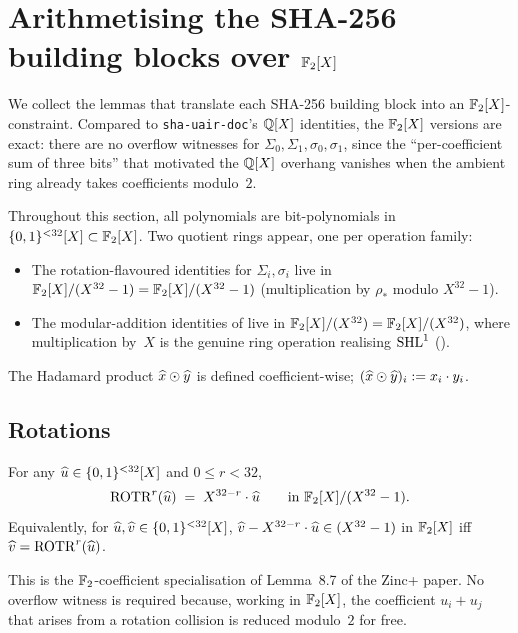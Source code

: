 \section{Arithmetising the SHA-256 building blocks over $\mathbb{F}_2[X]$}\label{sec:arith}

We collect the lemmas that translate each SHA-256 building block into
an $\mathbb{F}_2[X]$-constraint. Compared to \texttt{sha-uair-doc}'s $\mathbb{Q}[X]$
identities, the $\mathbb{F}_2[X]$ versions are exact: there are no overflow
witnesses for $\Sigma_0, \Sigma_1, \sigma_0, \sigma_1$, since the
``per-coefficient sum of three bits'' that motivated the $\mathbb{Q}[X]$
overhang vanishes when the ambient ring already takes coefficients
modulo~$2$.

Throughout this section, all polynomials are bit-polynomials in
$\{0,1\}^{<32}[X] \subset \mathbb{F}_2[X]$. Two quotient rings appear, one per
operation family:
\begin{itemize}[leftmargin=2em,topsep=2pt]
  \item The rotation-flavoured identities for $\Sigma_i, \sigma_i$
        live in $\mathbb{F}_2[X]/(X^{32}-1) = \mathbb{F}_2[X]/(X^{32}-1)$ (multiplication by
        $\rho_*$ modulo $X^{32}-1$).
  \item The modular-addition identities of  live in
        $\mathbb{F}_2[X]/(X^{32}) = \mathbb{F}_2[X]/(X^{32})$, where multiplication by~$X$ is
        the genuine ring operation realising $\operatorname{SHL}^{1}$
        ().
\end{itemize}
The Hadamard product $\widehat{x} \odot \widehat{y}$ is defined coefficient-wise;
$(\widehat{x} \odot \widehat{y})_i := x_i \cdot y_i$.

\subsection{Rotations}\label{sec:rot}

\begin{lemma}\label{lem:rot}
For any $\widehat{u} \in \{0,1\}^{<32}[X]$ and $0 \le r < 32$,
$$
\operatorname{ROTR}^{r}(\widehat{u}) \;=\; X^{32-r}\cdot \widehat{u} \qquad \text{in } \mathbb{F}_2[X]/(X^{32}-1).
$$
Equivalently, for $\widehat{u}, \widehat{v} \in \{0,1\}^{<32}[X]$,
$\widehat{v} - X^{32-r}\cdot \widehat{u} \in (X^{32}-1)$ in $\mathbb{F}_2[X]$ iff
$\widehat{v} = \operatorname{ROTR}^{r}(\widehat{u})$.
\end{lemma}

This is the $\mathbb{F}_2$-coefficient specialisation of Lemma~8.7 of the
Zinc+ paper. No overflow witness is required because, working in
$\mathbb{F}_2[X]$, the coefficient $u_i + u_j$ that arises from a rotation
collision is reduced modulo~$2$ for free.

